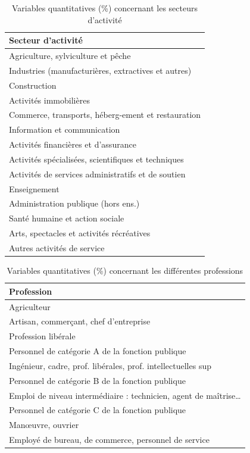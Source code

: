 \documentclass[12pt, a4paper, titlepage, table]{article}
\begin{document}
\begin{table}[H]
	\centering
	\begin{tabularx}{\textwidth}{|X|}
		\hline
		\textbf{Secteur d'activité} \\
		\hline
		Agriculture, sylviculture et pêche \\
		\hline
		Industries (manufacturières,  extractives et autres) \\
		\hline
		Construction \\
		\hline
		Activités immobilières \\
		\hline
		Commerce, transports, héberg-ement et restauration \\
		\hline
		Information et communication \\
		\hline
		Activités financières et d’assurance \\
		\hline
		Activités spécialisées, scientifiques et techniques \\
		\hline
		Activités de services administratifs et de soutien \\
		\hline
		Enseignement \\
		\hline
		Administration publique (hors ens.) \\
		\hline
		Santé humaine et action sociale \\
		\hline
		Arts, spectacles et activités récréatives \\
		\hline
		Autres activités de service \\
		\hline
	\end{tabularx}
	\caption{Variables quantitatives (\%) concernant les secteurs d'activité}
	\label{tab:variables_liste3}
\end{table}

\begin{table}[H]
	\centering
	\begin{tabularx}{\textwidth}{|X|}
		\hline
		\textbf{Profession} \\
		\hline
		Agriculteur \\
		\hline
		Artisan, commerçant, chef d'entreprise \\
		\hline
		Profession libérale \\
		\hline
		Personnel de catégorie A de la fonction publique \\
		\hline
		Ingénieur, cadre, prof. libérales, prof. intellectuelles sup \\
		\hline
		Personnel de catégorie B de la fonction publique \\
		\hline
		Emploi de niveau intermédiaire : technicien, agent de maîtrise… \\
		\hline
		Personnel de catégorie C de la fonction publique \\
		\hline
		Manœuvre, ouvrier \\
		\hline
		Employé de bureau, de commerce, personnel de service \\
		\hline
	\end{tabularx}
	\caption{Variables quantitatives (\%) concernant les différentes professions}
	\label{tab:variables_liste4}
\end{table}
\end{document}
